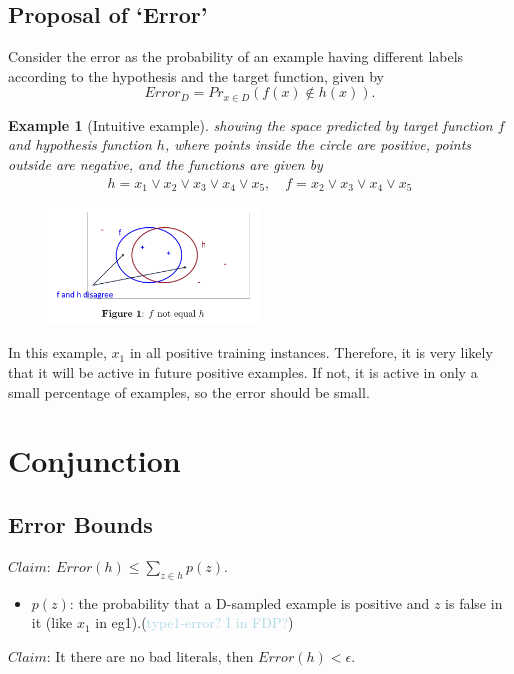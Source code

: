\documentclass[12pt, a4paper, oneside]{article}
\newtheorem{example}[theorem]{Example}
\begin{document}
\subsection{Proposal of ‘Error’}
Consider the error as the probability of an example having different labels according to the hypothesis and the target function, given by
\begin{equation*}
    Error_D = Pr_{x \in D}(f(x) \notin h(x)).
\end{equation*}

\begin{example}[Intuitive example]
    showing the space predicted by target function $f$ and hypothesis function $h$, where points inside the circle are positive, points outside are negative, and the functions are given by
    \begin{gather*}
        h = x_1 \vee x_2 \vee x_3 \vee x_4 \vee x_5, \quad f = x_2 \vee x_3 \vee x_4 \vee x_5
    \end{gather*}
\end{example}
\begin{figure}[h]
    \centering %
    \includegraphics[width=0.5\textwidth]{eg1.png} %
\end{figure}
In this example, $x_1$ in all positive training instances. Therefore, it is very likely that it will be active in future positive examples. If not, it is active in only a small percentage of examples, so the error should be small.

\section{Conjunction}
\subsection{Error Bounds}
$Claim: \ Error(h) \leq \sum_{z\in h} p(z).$
\begin{itemize}
    \item $p(z)$: the probability that a D-sampled example is positive and $z$ is false in it (like $x_1$ in eg1).(\textcolor{lightBlue}{type1-error? I in FDP?})
\end{itemize}
$Claim $: It there are no bad literals, then $Error(h) < \epsilon.$
\end{document}
